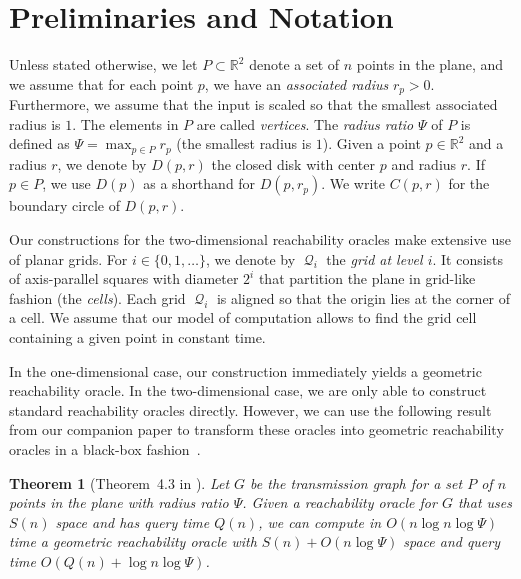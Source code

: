\documentclass[11pt,a4paper]{paper}
\newtheorem{theorem}{Theorem}[section]
\newcommand{\mathset}[1]{\ensuremath {\mathbb {#1}}}
\newcommand{\R}{\mathset{R}}
\DeclareMathOperator{\Q}{\mathcal{Q}}
\begin{document}
\section{Preliminaries and Notation}
\label{sec:prelims}

Unless stated otherwise, we let $P \subset \R^2$ denote a set of
$n$ points in the plane,
and we assume that for each point $p$, we have an
\emph{associated radius} $r_p > 0$.
Furthermore, we assume that the input is scaled so that the smallest
associated radius is $1$.
The elements in $P$ are called \emph{vertices}.
The \emph{radius ratio} $\Psi$ of $P$ is defined as
$\Psi = \max_{p \in P} r_p$ (the 
smallest radius is $1$).
Given a point $p \in \R^2$ and a radius $r$, we denote by $D(p, r)$
the closed disk with center $p$ and radius $r$. If $p \in P$, we
use $D(p)$ as a shorthand for $D(p, r_p)$. We write
$C(p, r)$ for the boundary circle of $D(p, r)$.

Our constructions for the two-dimensional reachability oracles make extensive
use of planar grids. For $i \in \{0, 1, \dots\}$,
we denote by  $\Q_i$ the \emph{grid at level $i$}. It consists of
axis-parallel squares with diameter $2^i$ that partition the
plane in grid-like fashion (the \emph{cells}).
Each grid $\Q_i$ is aligned so that the origin lies at the corner of a cell.
We assume that our model of computation allows to
 find
the grid cell containing a given point
  in constant time.

In the one-dimensional case, our construction immediately yields a geometric
reachability oracle. In the two-dimensional case, we are only able to
construct standard reachability oracles directly. However, we can use the following
result from our companion paper to transform these oracles into geometric reachability
oracles in a black-box fashion~\cite{KaplanEtAl15}.

\begin{theorem}[Theorem~4.3 in \cite{KaplanEtAl15}]
\label{thm:geometricreachability}
Let $G$ be the transmission graph for a set $P$ of $n$ points in the plane with radius
ratio $\Psi$. Given a reachability oracle for $G$ that uses $S(n)$ space and
has query time $Q(n)$, we can compute in $O(n \log n \log \Psi)$ time a
geometric reachability oracle with  $S(n) + O(n \log \Psi)$ space and
query time $O(Q(n) + \log n \log \Psi)$.
\end{theorem}
\end{document}
